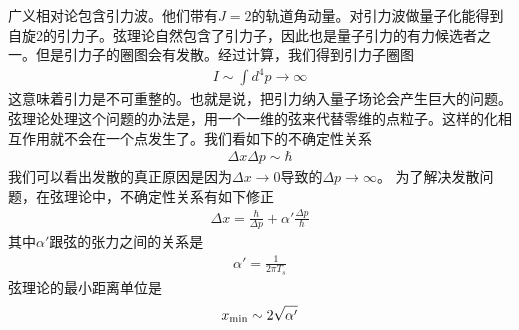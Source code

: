  
 广义相对论包含引力波。他们带有$J = 2$的轨道角动量。对引力波做量子化能得到自旋2的引力子。弦理论自然包含了引力子，因此也是量子引力的有力候选者之一。但是引力子的圈图会有发散。经过计算，我们得到引力子圈图
 \begin{align}
 I \sim \int d^4 p \rightarrow \infty 
 \end{align}
 这意味着引力是不可重整的。也就是说，把引力纳入量子场论会产生巨大的问题。弦理论处理这个问题的办法是，用一个一维的弦来代替零维的点粒子。这样的化相互作用就不会在一个点发生了。我们看如下的不确定性关系
 \begin{align}
\Delta x \Delta p \sim \hbar  
 \end{align}
我们可以看出发散的真正原因是因为$\Delta x \rightarrow 0$导致的$\Delta p \rightarrow  \infty  $。  为了解决发散问题，在弦理论中，不确定性关系有如下修正
\begin{align}
\Delta x  = \frac{\hbar}{\Delta p} + \alpha' \frac{\Delta p}{\hbar }
\end{align}
其中$\alpha'$跟弦的张力之间的关系是
\begin{align}
\alpha ' = \frac{1}{2 \pi T_s} 
\end{align}
弦理论的最小距离单位是
\begin{align}
x_{\rm min} \sim 2 \sqrt{\alpha'}
\end{align}

